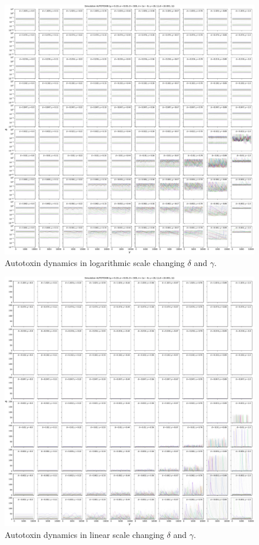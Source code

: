 \documentclass{article}
\begin{document}
\clearpage

\begin{figure}[H]
    \centering
    \includegraphics[width=\linewidth]{DeltaGamma/10autotoxFP.pdf}
    \caption{Autotoxin dynamics in logarithmic scale changing $\delta$ and $\gamma$.}
\end{figure}

\clearpage

\begin{figure}[H]
    \centering
    \includegraphics[width=\linewidth]{DeltaGamma/10AutotoxFPLinear.pdf}
    \caption{Autotoxin dynamics in linear scale changing $\delta$ and $\gamma$.}
\end{figure}
\end{document}
